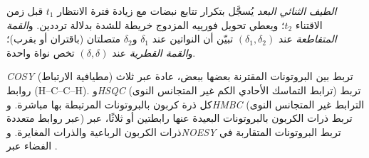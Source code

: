 \begin{definition}\label{def:b3:advanced-nmr:two-d}
\emph{الطيف الثنائي البعد} يُسجَّل
بتكرار تتابع نبضات مع زيادة فترة الانتظار $t_1$ قبل
زمن الاقتناء $t_2$؛ ويعطي تحويل فورييه المزدوج خريطة للشدة
بدلالة ترددين. و\emph{القمة المتقاطعة} عند $(\delta_1,
\delta_2)$ تبيّن أن النواتين عند $\delta_1$ و$\delta_2$ متصلتان (باقتران أو
بقرب)؛ و\emph{القمة القطرية} عند $(\delta, \delta)$ تخص
نواة واحدة.
\end{definition}

\begin{definition}\label{def:b3:advanced-nmr:experiments}
\emph{COSY} (مطيافية الارتباط) تربط بين البروتونات المقترنة
بعضها ببعض، عادة عبر ثلاث روابط (H--C--C--H). و\emph{HSQC}
(ترابط التماسك الأحادي الكم غير المتجانس النوى) تربط كل ذرة كربون بالبروتونات
المرتبطة بها مباشرة. و\emph{HMBC} (الترابط غير المتجانس النوى
عبر روابط متعددة) تربط ذرات الكربون بالبروتونات البعيدة عنها رابطتين أو ثلاثًا،
عبر ذرات الكربون الرباعية والذرات المغايرة. و\emph{NOESY}
تربط البروتونات المتقاربة في الفضاء عبر .
\end{definition}

